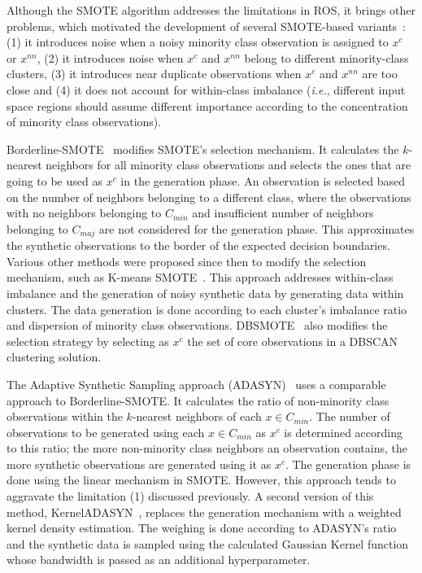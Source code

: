 Although the SMOTE algorithm addresses the limitations in ROS, it brings other
problems, which motivated the development of several SMOTE-based
variants~\cite{douzas2019geometric}: (1) it introduces noise when a noisy
minority class observation is assigned to $x^c$ or $x^{nn}$, (2) it
introduces noise when $x^c$ and $x^{nn}$ belong to different minority-class
clusters, (3) it introduces near duplicate observations when $x^c$ and
$x^{nn}$ are too close and (4) it does not account for within-class
imbalance (\textit{i.e.}, different input space regions should assume
different importance according to the concentration of minority class
observations).

Borderline-SMOTE~\cite{han2005borderline} modifies SMOTE's selection
mechanism. It calculates the $k$-nearest neighbors for all minority class
observations and selects the ones that are going to be used as $x^c$ in the
generation phase. An observation is selected based on the number of neighbors
belonging to a different class, where the observations with no neighbors
belonging to $C_{min}$ and insufficient number of neighbors belonging to
$C_{maj}$ are not considered for the generation phase. This approximates the
synthetic observations to the border of the expected decision boundaries.
Various other methods were proposed since then to modify the selection mechanism,
such as K-means SMOTE~\cite{douzas2018improving}. This approach addresses
within-class imbalance and the generation of noisy synthetic data by
generating data within clusters. The data generation is done according to each
cluster's imbalance ratio and dispersion of minority class observations.
DBSMOTE~\cite{bunkhumpornpat2012dbsmote} also modifies the selection strategy
by selecting as $x^c$ the set of core observations in a DBSCAN clustering
solution.

The Adaptive Synthetic Sampling approach (ADASYN)~\cite{he2008adasyn} uses a
comparable approach to Borderline-SMOTE\@. It calculates the ratio of
non-minority class observations within the $k$-nearest neighbors of each $x
\in C_{min}$. The number of observations to be generated using each $x \in
C_{min}$ as $x^c$ is determined according to this ratio; the more non-minority
class neighbors an observation contains, the more synthetic observations are
generated using it as $x^c$. The generation phase is done using the linear
mechanism in SMOTE\@. However, this approach tends to aggravate the limitation
(1) discussed previously. A second version of this method,
KernelADASYN~\cite{tang2015kerneladasyn}, replaces the generation mechanism
with a weighted kernel density estimation. The weighing is done according to
ADASYN's ratio and the synthetic data is sampled using the calculated Gaussian
Kernel function whose bandwidth is passed as an additional hyperparameter.

